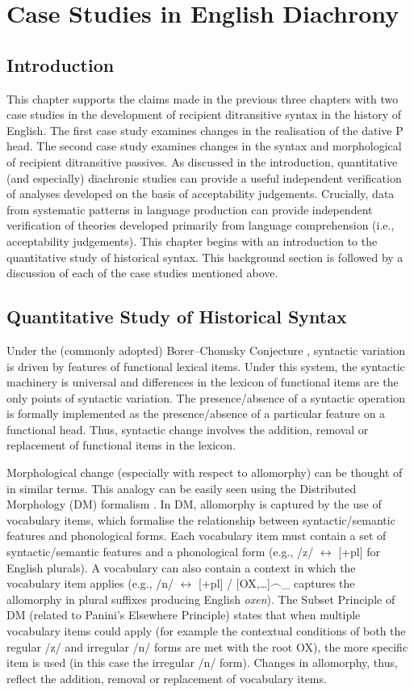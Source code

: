 \chapter{Case Studies in English Diachrony}\label{ch:diachron}
\section{Introduction}
This chapter supports the claims made in the previous three chapters with two case studies in the development of recipient ditransitive syntax in the history of English. The first case study examines changes in the realisation of the dative P head. The second case study examines changes in the syntax and morphological of recipient ditransitive passives. As discussed in the introduction, quantitative (and especially) diachronic studies can provide a useful independent verification of analyses developed on the basis of acceptability judgements. Crucially, data from systematic patterns in language production can provide independent verification of theories developed primarily from language comprehension (i.e., acceptability judgements). This chapter begins with an introduction to the quantitative study of historical syntax. This background section is followed by a discussion of each of the case studies mentioned above.

\section{Quantitative Study of Historical Syntax}
	Under the (commonly adopted) Borer--Chomsky Conjecture \citep{Baker.2008}, syntactic variation is driven by features of functional lexical items. Under this system, the syntactic machinery is universal and differences in the lexicon of functional items are the only points of syntactic variation. The presence/absence of a syntactic operation is formally implemented as the presence/absence of a particular feature on a functional head. Thus, syntactic change involves the addition, removal or replacement of functional items in the lexicon.

	Morphological change (especially with respect to allomorphy) can be thought of in similar terms. This analogy can be easily seen using the Distributed Morphology (DM) formalism \citep{Halle.1993}. In DM, allomorphy is captured by the use of vocabulary items, which formalise the relationship between syntactic/semantic features and phonological forms. Each vocabulary item must contain a set of syntactic/semantic features and a phonological form (e.g., /z/ $\leftrightarrow$ [+pl] for English plurals). A vocabulary can also contain a context in which the vocabulary item applies (e.g., /n/ $\leftrightarrow$ [+pl] / [OX,\dots]$\smallfrown$\_ captures the allomorphy in plural suffixes producing English \textit{oxen}). The Subset Principle of DM (related to Panini's Elsewhere Principle) states that when multiple vocabulary items could apply (for example the contextual conditions of both the regular /z/ and irregular /n/ forms are met with the root OX), the more specific item is used (in this case the irregular /n/ form). Changes in allomorphy, thus, reflect the addition, removal or replacement of vocabulary items.

